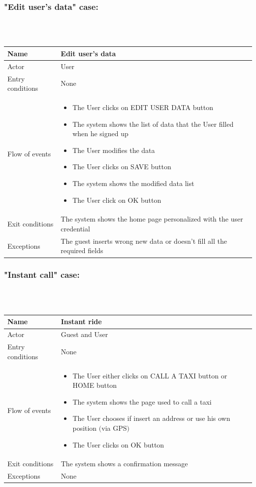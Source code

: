 \newpage
\subsubsection{"Edit user's data" case:}
\hfill \\
\\
\begin{tabular}{|p{3cm}|p{10cm}|}
\hline
Name & Edit user's data\\
\hline
Actor & User\\
\hline
Entry conditions & None\\
\hline
Flow of events &
	\begin{itemize}
		\item The User clicks on EDIT USER DATA button
		\item The system shows the list of data that the User filled when he signed up
		\item The User modifies the data
		\item The User clicks on SAVE button
		\item The system shows the modified data list
		\item The User click on OK button
	\end{itemize}	\\
\hline
Exit conditions & The system shows the home page personalized with the user credential\\
\hline
Exceptions & The guest inserts wrong new data or doesn't fill all the required fields\\
\hline
\end {tabular}


\newpage
\subsubsection{"Instant call" case:}
\hfill \\
\\
\begin{tabular}{|p{3cm}|p{10cm}|}
\hline
Name & Instant ride\\
\hline
Actor & Guest and User\\
\hline
Entry conditions & None\\
\hline
Flow of events &
	\begin{itemize}
		\item The User either clicks on CALL A TAXI button or HOME button
		\item The system shows the page used to call a taxi
		\item The User chooses if insert an address or use his own position $($via GPS$)$
		\item The User clicks on OK button
	\end{itemize}\\
\hline
Exit conditions & The system shows a confirmation message\\
\hline
Exceptions & None\\
\hline
\end {tabular}

